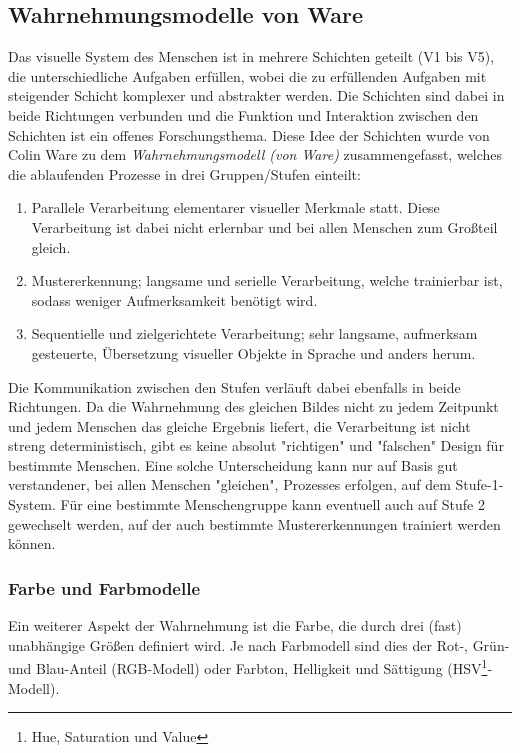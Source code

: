		\subsection{Wahrnehmungsmodelle von Ware}
			Das visuelle System des Menschen ist in mehrere Schichten geteilt (V1 bis V5), die unterschiedliche Aufgaben erfüllen, wobei die zu erfüllenden Aufgaben mit steigender Schicht komplexer und abstrakter werden. Die Schichten sind dabei in beide Richtungen verbunden und die Funktion und Interaktion zwischen den Schichten ist ein offenes Forschungsthema. Diese Idee der Schichten wurde von Colin Ware zu dem \emph{Wahrnehmungsmodell (von Ware)} zusammengefasst, welches die ablaufenden Prozesse in drei Gruppen/Stufen einteilt:
			\begin{enumerate}
				\item Parallele Verarbeitung elementarer visueller Merkmale statt. Diese Verarbeitung ist dabei nicht erlernbar und bei allen Menschen zum Großteil gleich.
				\item Mustererkennung; langsame und serielle Verarbeitung, welche trainierbar ist, sodass weniger Aufmerksamkeit benötigt wird.
				\item Sequentielle und zielgerichtete Verarbeitung; sehr langsame, aufmerksam gesteuerte, Übersetzung visueller Objekte in Sprache und anders herum.
			\end{enumerate}
			Die Kommunikation zwischen den Stufen verläuft dabei ebenfalls in beide Richtungen. Da die Wahrnehmung des gleichen Bildes nicht zu jedem Zeitpunkt und jedem Menschen das gleiche Ergebnis liefert, \dh die Verarbeitung ist nicht streng deterministisch, gibt es keine absolut "richtigen" und "falschen" Design für bestimmte Menschen. Eine solche Unterscheidung kann nur auf Basis gut verstandener, bei allen Menschen "gleichen", Prozesses erfolgen, \dh auf dem Stufe-1-System. Für eine bestimmte Menschengruppe kann eventuell auch auf Stufe 2 gewechselt werden, auf der auch bestimmte Mustererkennungen trainiert werden können.

			\subsubsection{Farbe und Farbmodelle}
				\label{subsubsec:farbe}

				Ein weiterer Aspekt der Wahrnehmung ist die Farbe, die durch drei (fast) unabhängige Größen definiert wird. Je nach Farbmodell sind dies \bspw der Rot-, Grün- und Blau-Anteil (RGB-Modell) oder Farbton, Helligkeit und Sättigung (HSV\footnote{Hue, Saturation und Value}-Modell).

